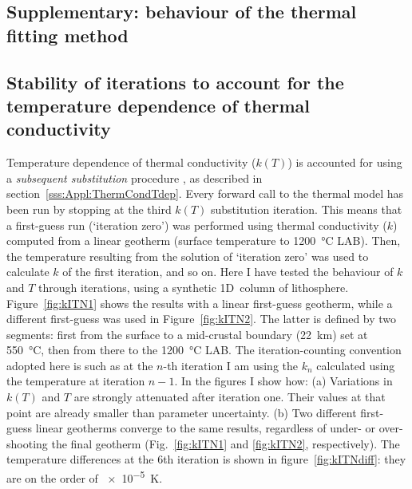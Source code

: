 \begin{subappendices}
\cleardoublepage
\section[Supplementary:~behaviour of the thermal fitting method]{Supplementary: behaviour of the thermal fitting method}
\label{s:ApplSup:MethodTests}

\subsection{Stability of iterations to account for the temperature dependence of thermal conductivity}
\label{ss:ApplSup:MethodTests:ItStab}

Temperature dependence of thermal conductivity ($k(T)$) is accounted for using a \textit{subsequent substitution} procedure \parencite[``Picard's method'', see e.g. ][]{Hauck1999}, as described in section~\ref{sss:Appl:ThermCondTdep}.
Every forward call to the thermal model has been run by stopping at the third $k(T)$ substitution iteration.
This means that a first-guess run (`iteration zero') was performed using thermal conductivity ($k$) computed from a linear geotherm (surface temperature to \SI{1200}{\celsius} LAB).
Then, the temperature resulting from the solution of `iteration zero' was used to calculate $k$ of the first iteration, and so on.
Here I have tested the behaviour of $k$ and $T$ through iterations, using a synthetic 1D~column of lithosphere.
Figure~\ref{fig:kITN1} shows the results with a linear first-guess geotherm, while a different first-guess was used in Figure~\ref{fig:kITN2}.
The latter is defined by two segments: first from the surface to a mid-crustal boundary (22~\si{\kilo \metre}) set at \SI{550}{\celsius}, then from there to the \SI{1200}{\celsius} LAB.
The iteration-counting convention adopted here is such as at the $n$-th iteration I am using the $k_n$ calculated using the temperature at iteration $n-1$.
In the figures I show how:
(a) Variations in $k(T)$ and $T$ are strongly attenuated after iteration one. Their values at that point are already smaller than parameter uncertainty.
(b) Two different first-guess linear geotherms converge to the same results, regardless of under- or over-shooting the final geotherm (Fig.~\ref{fig:kITN1} and \ref{fig:kITN2}, respectively). The temperature differences at the 6th iteration is shown in figure~\ref{fig:kITNdiff}: they are on the order of \SI{e-5}{\kelvin}.


\end{subappendices}
